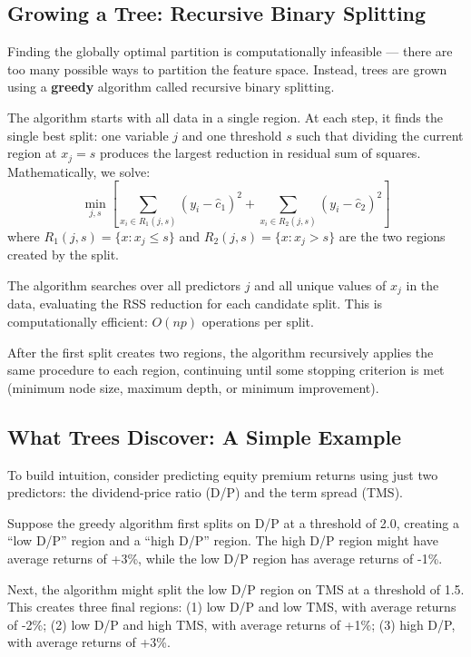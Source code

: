 \documentclass[11pt,a4paper]{article}
\newcommand{\keyword}[1]{\textbf{\textcolor{AccentOrange}{#1}}}
\begin{document}
\subsection{Growing a Tree: Recursive Binary Splitting}

Finding the globally optimal partition is computationally infeasible — there are too many possible ways to partition the feature space. Instead, trees are grown using a \keyword{greedy} algorithm called recursive binary splitting.

The algorithm starts with all data in a single region. At each step, it finds the single best split: one variable $j$ and one threshold $s$ such that dividing the current region at $x_j = s$ produces the largest reduction in residual sum of squares. Mathematically, we solve:
\[
\min_{j, s} \left[ \sum_{x_i \in R_1(j,s)} (y_i - \widehat{c}_1)^2 + \sum_{x_i \in R_2(j,s)} (y_i - \widehat{c}_2)^2 \right]
\]
where $R_1(j,s) = \{x : x_j \leq s\}$ and $R_2(j,s) = \{x : x_j > s\}$ are the two regions created by the split.

The algorithm searches over all predictors $j$ and all unique values of $x_j$ in the data, evaluating the RSS reduction for each candidate split. This is computationally efficient: $O(np)$ operations per split.

After the first split creates two regions, the algorithm recursively applies the same procedure to each region, continuing until some stopping criterion is met (minimum node size, maximum depth, or minimum improvement).

\subsection{What Trees Discover: A Simple Example}

To build intuition, consider predicting equity premium returns using just two predictors: the dividend-price ratio (D/P) and the term spread (TMS).

Suppose the greedy algorithm first splits on D/P at a threshold of 2.0, creating a ``low D/P'' region and a ``high D/P'' region. The high D/P region might have average returns of +3\%, while the low D/P region has average returns of -1\%.

Next, the algorithm might split the low D/P region on TMS at a threshold of 1.5. This creates three final regions: (1) low D/P and low TMS, with average returns of -2\%; (2) low D/P and high TMS, with average returns of +1\%; (3) high D/P, with average returns of +3\%.
\end{document}
